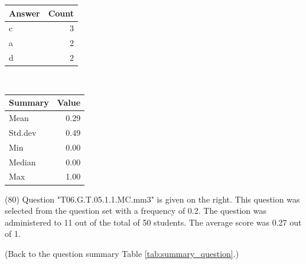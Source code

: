 \documentclass[12pt,english,nohyper]{tufte-handout}\usepackage[]{graphicx}\usepackage[]{color}
\begin{document}
\begin{center}%
\begin{tabular}{lr}
  \hline
Answer & Count \\ 
  \hline
c &   3 \\ 
  a &   2 \\ 
  d &   2 \\ 
   \hline
\end{tabular}
~~~~~~~~%
\begin{tabular}{lr}
  \hline
Summary & Value \\ 
  \hline
Mean & 0.29 \\ 
  Std.dev & 0.49 \\ 
  Min & 0.00 \\ 
  Median & 0.00 \\ 
  Max & 1.00 \\ 
   \hline
\end{tabular}
\end{center}\newpage{} (80) Question "T06.G.T.05.1.1.MC.mm3" is given on the right. This question was selected from the question set with a frequency of 0.2. The question was administered to 11 out of the total of 50 students. The average score was 0.27 out of 1.

 (Back to the question summary Table \ref{tab:summary_question}.)
\end{document}
